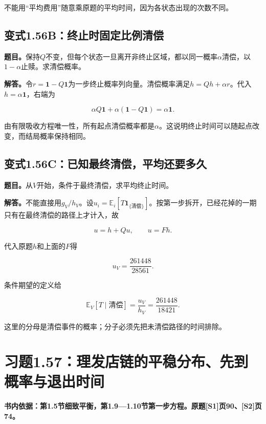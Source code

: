 \documentclass[
  11pt,a4paper,UTF8,fontset=fandol]{ctexart}
\begin{document}
不能用``平均费用''随意乘原题的平均时间，因为各状态出现的次数不同。

\subsection{变式1.56B：终止时固定比例清偿}\label{ux53d8ux5f0f1.56bux7ec8ux6b62ux65f6ux56faux5b9aux6bd4ux4f8bux6e05ux507f}

\textbf{题目。}保持\(Q\)不变，但每个状态一旦离开非终止区域，都以同一概率\(\alpha\)清偿，以\(1-\alpha\)止赎。求清偿概率。

\textbf{解答。}令\(r=\mathbf1-Q\mathbf1\)为一步终止概率列向量。清偿概率满足\(h=Qh+\alpha r\)。代入\(h=\alpha\mathbf1\)，右端为

\[
\alpha Q\mathbf1+\alpha(\mathbf1-Q\mathbf1)=\alpha\mathbf1.
\]

由有限吸收方程唯一性，所有起点清偿概率都是\(\boxed\alpha\)。这说明终止时间可以随起点改变，而结局概率保持相同。

\subsection{变式1.56C：已知最终清偿，平均还要多久}\label{ux53d8ux5f0f1.56cux5df2ux77e5ux6700ux7ec8ux6e05ux507fux5e73ux5747ux8fd8ux8981ux591aux4e45}

\textbf{题目。}从\(V\)开始，条件于最终清偿，求平均终止时间。

\textbf{解答。}不能直接用\(g_V/h_V\)。设\(u_i=\mathbb E_i[T\mathbf1_{\{\text{清偿}\}}]\)。按第一步拆开，已经花掉的一期只有在最终清偿的路径上才计入，故

\[
u=h+Qu,\qquad u=Fh.
\]

代入原题\(h\)和上面的\(F\)得

\[
u_V=\frac{261448}{28561}.
\]

条件期望的定义给

\[
\boxed{\mathbb E_V[T\mid\text{清偿}]=\frac{u_V}{h_V}=\frac{261448}{18421}.}
\]

这里的分母是清偿事件的概率；分子必须先把未清偿路径的时间排除。

\section{习题1.57：理发店链的平稳分布、先到概率与退出时间}\label{ux4e60ux98981.57ux7406ux53d1ux5e97ux94feux7684ux5e73ux7a33ux5206ux5e03ux5148ux5230ux6982ux7387ux4e0eux9000ux51faux65f6ux95f4}

\textbf{书内依据：第1.5节细致平衡，第1.9---1.10节第一步方程。原题{[}S1{]}页90、{[}S2{]}页74。}
\end{document}
